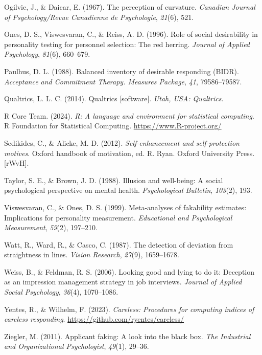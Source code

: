 \documentclass[
  ,jou]{apa6}
\newlength{\cslhangindent}
\newenvironment{CSLReferences}[2] %
 {\begin{list}{}{%
  \setlength{\itemindent}{0pt}
  \setlength{\leftmargin}{0pt}
  \setlength{\parsep}{0pt}
  \ifodd #1
   \setlength{\leftmargin}{\cslhangindent}
   \setlength{\itemindent}{-1\cslhangindent}
  \fi
  \setlength{\itemsep}{#2\baselineskip}}}
 {\end{list}}
\begin{document}
\begin{CSLReferences}{1}{0}
Ogilvie, J., \& Daicar, E. (1967). The perception of curvature. \emph{Canadian Journal of Psychology/Revue Canadienne de Psychologie}, \emph{21}(6), 521.

Ones, D. S., Viswesvaran, C., \& Reiss, A. D. (1996). Role of social desirability in personality testing for personnel selection: The red herring. \emph{Journal of Applied Psychology}, \emph{81}(6), 660--679.

Paulhus, D. L. (1988). Balanced inventory of desirable responding ({BIDR}). \emph{Acceptance and Commitment Therapy. Measures Package}, \emph{41}, 79586--79587.

Qualtrics, L. L. C. (2014). Qualtrics {[}software{]}. \emph{Utah, {USA}: Qualtrics}.

R Core Team. (2024). \emph{R: A language and environment for statistical computing}. R Foundation for Statistical Computing. \url{https://www.R-project.org/}

Sedikides, C., \& Alicke, M. D. (2012). \emph{Self-enhancement and self-protection motives}. Oxford handbook of motivation, ed. R. Ryan. Oxford University Press.{[}{rWvH}{]}.

Taylor, S. E., \& Brown, J. D. (1988). Illusion and well-being: A social psychological perspective on mental health. \emph{Psychological Bulletin}, \emph{103}(2), 193.

Viswesvaran, C., \& Ones, D. S. (1999). Meta-analyses of fakability estimates: Implications for personality measurement. \emph{Educational and Psychological Measurement}, \emph{59}(2), 197--210.

Watt, R., Ward, R., \& Casco, C. (1987). The detection of deviation from straightness in lines. \emph{Vision Research}, \emph{27}(9), 1659--1678.

Weiss, B., \& Feldman, R. S. (2006). Looking good and lying to do it: Deception as an impression management strategy in job interviews. \emph{Journal of Applied Social Psychology}, \emph{36}(4), 1070--1086.

Yentes, R., \& Wilhelm, F. (2023). \emph{Careless: Procedures for computing indices of careless responding}. \url{https://github.com/ryentes/careless/}

Ziegler, M. (2011). Applicant faking: A look into the black box. \emph{The Industrial and Organizational Psychologist}, \emph{49}(1), 29--36.

\end{CSLReferences}

\endgroup
\end{document}
